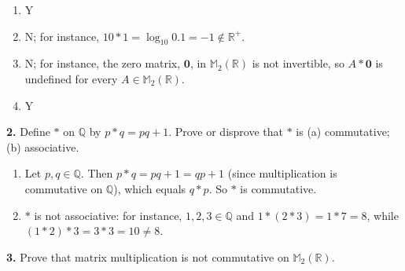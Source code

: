 \documentclass[10pt,]{book}
\theoremstyle{plain}
\theoremstyle{definition}
\theoremstyle{definition}
\theoremstyle{definition}
\theoremstyle{definition}
\numberwithin{equation}{section}
\def\R{\mathbb{R}}
\def\Q{\mathbb{Q}}
\def\M{\mathbb{M}}
\def\0{\mathbf 0}
\begin{document}
\par\smallskip
\leavevmode%
\begin{enumerate}[label=(\alph*)]
\item\hypertarget{li-62}{}
          Y
\item\hypertarget{li-63}{}
          N; for instance, \(10*1=\log_{10}0.1=-1\not\in\R^+\).
\item\hypertarget{li-64}{}
          N; for instance, the zero matrix, \(\0\), in \(\M_2(\R)\) is not invertible, so \(A*\0\) is undefined for every \(A\in\M_2(\R)\).
\item\hypertarget{li-65}{}
          Y
\end{enumerate}
\par\smallskip
\noindent\textbf{2.}\quad{}
        Define \(*\) on \(\Q\) by \(p*q=pq+1\). Prove or disprove that \(*\) is (a) commutative; (b) associative.
\par\smallskip
\leavevmode%
\begin{enumerate}[label=(\alph*)]
\item\hypertarget{li-66}{}
          Let \(p,q\in \Q\).  Then \(p*q=pq+1=qp+1\) (since multiplication is commutative on \(\Q\)), which equals \(q*p\).  So \(*\) is commutative.
\item\hypertarget{li-67}{}
          \(*\) is not associative: for instance, \(1,2,3\in \Q\) and \(1*(2*3)=1*7=8\), while \((1*2)*3=3*3=10\neq 8\).
\end{enumerate}
\par\smallskip
\noindent\textbf{3.}\quad{}
        Prove that matrix multiplication is not commutative on \(\M_2(\R)\).
\par\smallskip
\end{document}
